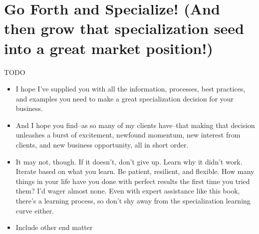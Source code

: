 \chapter{Go Forth and Specialize! (And then grow that specialization seed into a great market position!)}

TODO

\begin{itemize}
\item I hope I've supplied you with all the information, processes, best practices, and examples you need to make a great specialization decision for your business.
\item And I hope you find--as so many of my clients have--that making that decision unleashes a burst of excitement, newfound momentum, new interest from clients, and new business opportunity, all in short order.
\item It may not, though. If it doesn't, don't give up. Learn why it didn't work. Iterate based on what you learn. Be patient, resilient, and flexible. How many things in your life have you done with perfect results the first time you tried them? I'd wager almost none. Even with expert assistance like this book, there's a learning process, so don't shy away from the specialization learning curve either.
\item Include other end matter
\end{itemize}